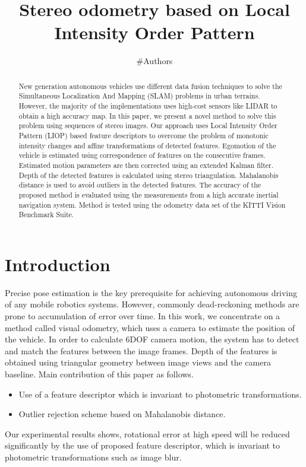 \documentclass{article}
\author{\#Authors}
\title{Stereo odometry based on  Local Intensity Order Pattern}
\begin{document}
\maketitle
\begin{abstract}
New generation autonomous vehicles use different data fusion techniques to solve the Simultaneous Localization And Mapping (SLAM) problems in urban terrains.  However, the majority of the implementations uses high-cost sensors like LIDAR to obtain a high accuracy map. In this paper, we  present a novel method  to solve this problem using sequences of stereo images. Our approach uses Local Intensity Order Pattern (LIOP) based  feature descriptors to  overcome the problem of monotonic intensity changes and affine transformations of detected features. Egomotion of the vehicle is estimated using correspondence of features on the consecutive frames. Estimated motion parameters are then corrected using an extended Kalman filter. Depth of the detected features is calculated using stereo triangulation. Mahalanobis distance  is used to avoid outliers in the detected features.
The accuracy of  the proposed method is  evaluated using the measurements from a  high accurate inertial navigation system. Method is tested using the odometry data set of the KITTI Vision Benchmark Suite.
			
\end{abstract}
\section{Introduction}

 Precise  pose estimation is  the key prerequisite for  achieving autonomous driving of any mobile robotics systems. However, commonly dead-reckoning methods are prone to accumulation of error over time. In this work, we concentrate on a method called visual odometry, which uses a  camera to estimate the position of the vehicle. In order to calculate 6DOF camera motion, the system has to detect and match the features between the image frames. Depth of the features is obtained using triangular geometry between  image views and the camera baseline. Main contribution of this paper  as follows.

\begin{itemize}
\item Use of a feature descriptor which is invariant to photometric transformations.
\item Outlier rejection scheme based on Mahalanobis distance.
\end{itemize}
\par
Our experimental results shows, rotational error at high speed will be reduced significantly by the use of  proposed feature descriptor, which is invariant to  photometric transformations such as image blur. 
\end{document}

